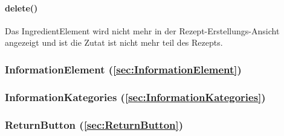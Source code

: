 \documentclass[parskip=full]{scrartcl}
\begin{document}
                \paragraph*{delete()} Das IngredientElement wird nicht mehr in der Rezept-Erstellungs-Ansicht angezeigt und ist die Zutat ist nicht mehr teil des Rezepts.

        \subsubsection*{InformationElement (\ref{sec:InformationElement})}

        \subsubsection*{InformationKategories (\ref{sec:InformationKategories})}

        \subsubsection*{ReturnButton (\ref{sec:ReturnButton})}
        
\end{document}
